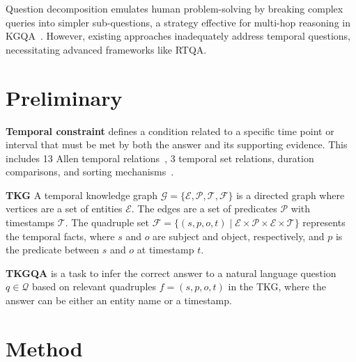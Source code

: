 \documentclass[11pt]{article}
\begin{document}
Question decomposition emulates human problem-solving by breaking complex queries into simpler sub-questions, a strategy effective for multi-hop reasoning in KGQA~\cite{cao2020kqa,khot2022decomposed,trivedi2022musique,cao-etal-2023-probabilistic}. However, existing approaches inadequately address temporal questions, necessitating advanced frameworks like RTQA.

\section{Preliminary}

\textbf{Temporal constraint} defines a condition related to a specific time point or interval that must be met by both the answer and its supporting evidence. This includes 13 Allen temporal relations~\cite{allen1984towards}, 3 temporal set relations, duration comparisons, and sorting mechanisms~\cite{sun2025timelinekgqa}.

\textbf{TKG} A temporal knowledge graph \(\mathcal{G} = \{\mathcal{E}, \mathcal{P}, \mathcal{T}, \mathcal{F}\}\) is a directed graph where vertices are a set of entities \(\mathcal{E}\). The edges are a set of predicates \(\mathcal{P}\) with timestamps \(\mathcal{T}\). The quadruple set 
\(\mathcal{F} = \{(s, p, o, t) \mid \mathcal{E} \times \mathcal{P} \times \mathcal{E} \times \mathcal{T}\}\) 
represents the temporal facts, where \(s\) and \(o\) are subject and object, respectively, and \(p\) is the predicate between \(s\) and \(o\) at timestamp \(t\).

\textbf{TKGQA} is a task to infer the correct answer to a natural language question \(q \in \mathcal{Q}\) based on relevant quadruples \(f = (s, p, o, t)\) in the TKG, where the answer can be either an entity name or a timestamp.

\section{Method}
\end{document}
